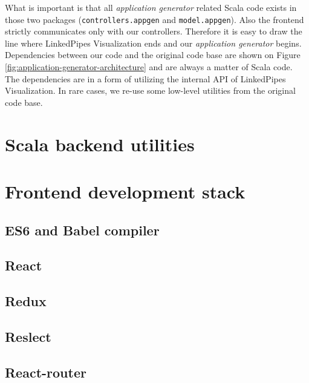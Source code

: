 What is important is that all \emph{application generator} related Scala code exists in those two packages (\texttt{controllers.appgen} and \texttt{model.appgen}). Also the frontend strictly communicates only  with our controllers. Therefore it is easy to draw the line where LinkedPipes Visualization ends and our \emph{application generator} begins. Dependencies between our code and the original code base are shown on Figure \ref{fig:application-generator-architecture} and are always a matter of Scala code. The dependencies are in a form of utilizing the internal API of LinkedPipes Visualization. In rare cases, we re-use some low-level utilities from the original code base.

\section{Scala backend utilities}







\section{Frontend development stack}

\subsection{ES6 and Babel compiler}

\subsection{React}

\subsection{Redux}

\subsection{Reslect}

\subsection{React-router}



